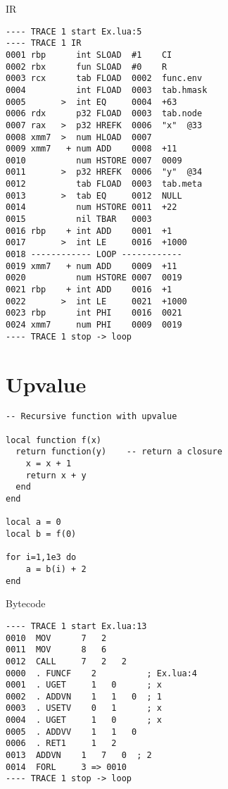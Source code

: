 \noindent
IR

\begin{multicols}{2}
\begin{lstlisting}[style=DumpStyle]
---- TRACE 1 start Ex.lua:5
---- TRACE 1 IR
0001 rbp      int SLOAD  #1    CI
0002 rbx      fun SLOAD  #0    R
0003 rcx      tab FLOAD  0002  func.env
0004          int FLOAD  0003  tab.hmask
0005       >  int EQ     0004  +63 
0006 rdx      p32 FLOAD  0003  tab.node
0007 rax   >  p32 HREFK  0006  "x"  @33
0008 xmm7  >  num HLOAD  0007
0009 xmm7   + num ADD    0008  +11 
0010          num HSTORE 0007  0009
0011       >  p32 HREFK  0006  "y"  @34
0012          tab FLOAD  0003  tab.meta
0013       >  tab EQ     0012  NULL
0014          num HSTORE 0011  +22 
0015          nil TBAR   0003
0016 rbp    + int ADD    0001  +1  
0017       >  int LE     0016  +1000
0018 ------------ LOOP ------------
0019 xmm7   + num ADD    0009  +11 
0020          num HSTORE 0007  0019
0021 rbp    + int ADD    0016  +1  
0022       >  int LE     0021  +1000
0023 rbp      int PHI    0016  0021
0024 xmm7     num PHI    0009  0019
---- TRACE 1 stop -> loop
\end{lstlisting}
\end{multicols}




\section{Upvalue}

\begin{mdframed}[style=LuaStyleFrame]
\begin{lstlisting}[style=LuaStyle]
-- Recursive function with upvalue

local function f(x)
  return function(y)    -- return a closure
    x = x + 1
    return x + y
  end
end

local a = 0
local b = f(0)

for i=1,1e3 do
	a = b(i) + 2
end
\end{lstlisting}
\end{mdframed}

\noindent
Bytecode

\begin{multicols}{2}
\begin{lstlisting}[style=DumpStyle]
---- TRACE 1 start Ex.lua:13
0010  MOV      7   2
0011  MOV      8   6
0012  CALL     7   2   2
0000  . FUNCF    2          ; Ex.lua:4
0001  . UGET     1   0      ; x
0002  . ADDVN    1   1   0  ; 1
0003  . USETV    0   1      ; x
0004  . UGET     1   0      ; x
0005  . ADDVV    1   1   0
0006  . RET1     1   2
0013  ADDVN    1   7   0  ; 2
0014  FORL     3 => 0010
---- TRACE 1 stop -> loop
\end{lstlisting}
\end{multicols}

